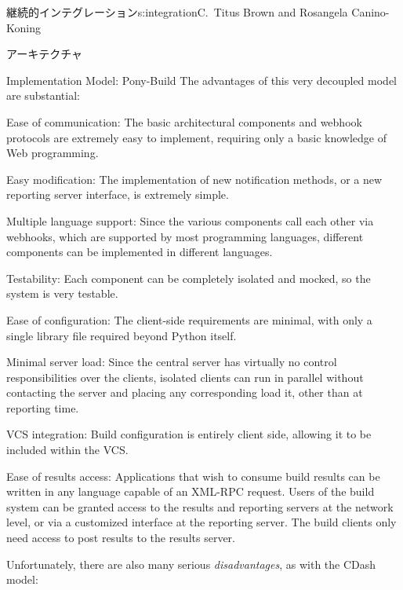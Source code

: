 \begin{aosachapter}{継続的インテグレーション}{s:integration}{C.\ Titus Brown and Rosangela Canino-Koning}
\begin{aosasect1}{アーキテクチャ}
\begin{aosasect2}{Implementation Model: Pony-Build}
The advantages of this very decoupled model are substantial:

\begin{aosadescription}

  \item{Ease of communication:} The basic architectural
  components and webhook protocols are extremely easy to implement,
  requiring only a basic knowledge of Web programming.

  \item{Easy modification:} The implementation of new
  notification methods, or a new reporting server interface, is
  extremely simple.

  \item{Multiple language support:} Since the various components
  call each other via webhooks, which are supported by most
  programming languages, different components can be implemented in
  different languages.

  \item{Testability:} Each component can be completely isolated
  and mocked, so the system is very testable.

  \item{Ease of configuration:} The client-side requirements are
  minimal, with only a single library file required beyond Python
  itself.

  \item{Minimal server load:} Since the central server has
  virtually no control responsibilities over the clients, isolated
  clients can run in parallel without contacting the server and
  placing any corresponding load it, other than at reporting time.

  \item{VCS integration:} Build configuration is entirely client
  side, allowing it to be included within the VCS.

  \item{Ease of results access:} Applications that wish to
  consume build results can be written in any language capable of an
  XML-RPC request. Users of the build system can be granted access
  to the results and reporting servers at the network level, or via
  a customized interface at the reporting server. The build clients
  only need access to post results to the results server.

\end{aosadescription}

Unfortunately, there are also many serious \emph{disadvantages}, as
with the CDash model:


\end{aosasect2}
\end{aosasect1}
\end{aosachapter}

